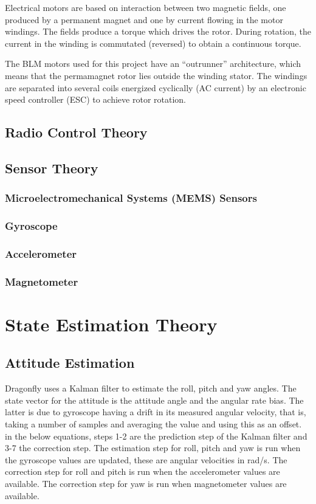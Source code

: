 \documentclass[a4paper]{report}
\begin{document}
Electrical motors are based on interaction between two magnetic fields, one produced by a permanent magnet and one by current flowing in the motor windings. The fields produce a torque which drives the rotor. During rotation, the current in the winding is commutated (reversed) to obtain a continuous torque.

The BLM motors used for this project have an “outrunner” architecture, which means that the permamagnet rotor lies outside the winding stator. The windings are separated into several coils energized cyclically (AC current) by an electronic speed controller (ESC) to achieve rotor rotation.

	\section{Radio Control Theory}

	\section{Sensor Theory}

		\subsection{Microelectromechanical Systems (MEMS) Sensors}

		\subsection{Gyroscope}

		\subsection{Accelerometer}

		\subsection{Magnetometer}

\chapter{State Estimation Theory}
	\section{Attitude Estimation}
Dragonfly uses a Kalman filter to estimate the roll, pitch and yaw angles. The state vector for the attitude is the attitude angle and the angular rate bias. The latter is due to gyroscope having a drift in its measured angular velocity, that is, taking a number of samples and averaging the value and using this as an offset. in the below equations, steps 1-2 are the prediction step of the Kalman filter and 3-7 the correction step. The estimation step for roll, pitch and yaw is run when the gyroscope values  are updated, these are angular velocities in rad/s. The correction step for roll and pitch is run when the accelerometer values are available. The correction step for yaw is run when magnetometer values are available.
\end{document}
